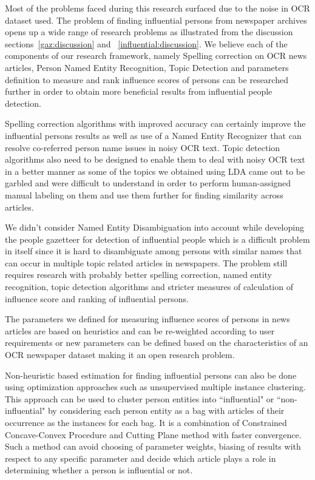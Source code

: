 \documentclass[letterpaper,11pt]{report}
\begin{document}
Most of the problems faced during this research surfaced due to the noise in OCR dataset used. The problem of finding influential persons from newspaper archives opens up a wide range of research problems as illustrated from the discussion sections~\ref{gaz:discussion} and ~\ref{influential:discussion}. 
We believe each of the components of our research framework, namely Spelling correction on OCR news articles, Person Named Entity Recognition, Topic Detection and parameters definition to measure and rank influence scores of persons can be researched further in order to obtain more beneficial results from influential people detection.

Spelling correction algorithms with improved accuracy can certainly improve the influential persons results as well as use of a Named Entity Recognizer that can resolve co-referred person name issues in noisy OCR text.
Topic detection algorithms also need to be designed to enable them to deal with noisy OCR text in a better manner as some of the topics we obtained using LDA came out to be garbled and were difficult to understand in order to perform human-assigned manual labeling on them and use them further for finding similarity across articles.

We didn't consider Named Entity Disambiguation into account while developing the people gazetteer for detection of influential people which is a difficult problem in itself since it is hard to disambiguate among persons with similar names that can occur in multiple topic related articles in newspapers. The problem still requires research with probably better spelling correction, named entity recognition, topic detection algorithms and stricter measures of calculation of influence score and ranking of influential persons.

 The parameters we defined for measuring influence scores of persons in news articles are based on heuristics and can be re-weighted according to user requirements or new parameters can be defined based on the characteristics of an OCR newspaper dataset making it an open research problem.

Non-heuristic based estimation for finding influential persons can also be done using optimization approaches such as unsupervised multiple instance clustering\cite{zhang2009m3ic}. This approach can be used to cluster person entities into ``influential" or ``non-influential" by considering each person entity as a bag with articles of their occurrence as the instances for each bag. It is a combination of Constrained Concave-Convex Procedure and  Cutting Plane method with faster convergence. Such a method can avoid choosing of parameter weights, biasing of results with respect to any specific parameter and decide which article plays a role in determining whether a person is influential or not.
  
\end{document}
